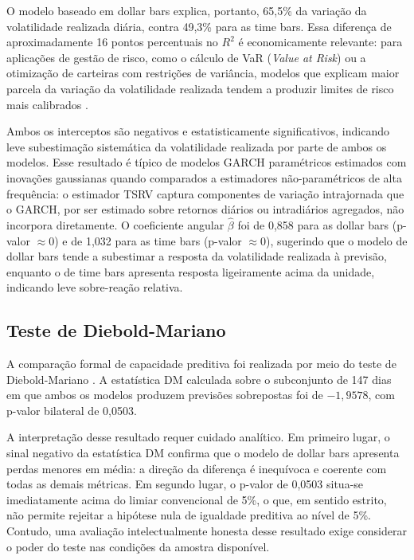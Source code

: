 O modelo baseado em dollar bars explica, portanto, 65,5\% da variação da volatilidade
realizada diária, contra 49,3\% para as time bars. Essa diferença de aproximadamente
16 pontos percentuais no $R^2$ é economicamente relevante: para aplicações de gestão
de risco, como o cálculo de VaR (\textit{Value at Risk}) ou a otimização de carteiras
com restrições de variância, modelos que explicam maior parcela da variação da volatilidade
realizada tendem a produzir limites de risco mais calibrados \citep{Andersen2003}.

Ambos os interceptos são negativos e estatisticamente significativos, indicando leve
subestimação sistemática da volatilidade realizada por parte de ambos os modelos.
Esse resultado é típico de modelos GARCH paramétricos estimados com inovações gaussianas
quando comparados a estimadores não-paramétricos de alta frequência: o estimador TSRV
captura componentes de variação intrajornada que o GARCH, por ser estimado sobre retornos
diários ou intradiários agregados, não incorpora diretamente. O coeficiente angular $\hat{\beta}$
foi de 0,858 para as dollar bars (p-valor $\approx 0$) e de 1,032 para as time bars
(p-valor $\approx 0$), sugerindo que o modelo de dollar bars tende a subestimar
a resposta da volatilidade realizada à previsão, enquanto o de time bars apresenta
resposta ligeiramente acima da unidade, indicando leve sobre-reação relativa.

\subsection{Teste de Diebold-Mariano}
\label{subsec:dm}

A comparação formal de capacidade preditiva foi realizada por meio do teste de
Diebold-Mariano \citep{DieboldMariano1995}. A estatística DM calculada sobre o subconjunto
de 147 dias em que ambos os modelos produzem previsões sobrepostas foi de $-1{,}9578$,
com p-valor bilateral de 0,0503.

A interpretação desse resultado requer cuidado analítico. Em primeiro lugar, o sinal
negativo da estatística DM confirma que o modelo de dollar bars apresenta perdas menores
em média: a direção da diferença é inequívoca e coerente com todas as demais métricas.
Em segundo lugar, o p-valor de 0,0503 situa-se imediatamente acima do limiar convencional
de 5\%, o que, em sentido estrito, não permite rejeitar a hipótese nula de igualdade
preditiva ao nível de 5\%. Contudo, uma avaliação intelectualmente honesta desse resultado
exige considerar o poder do teste nas condições da amostra disponível.

